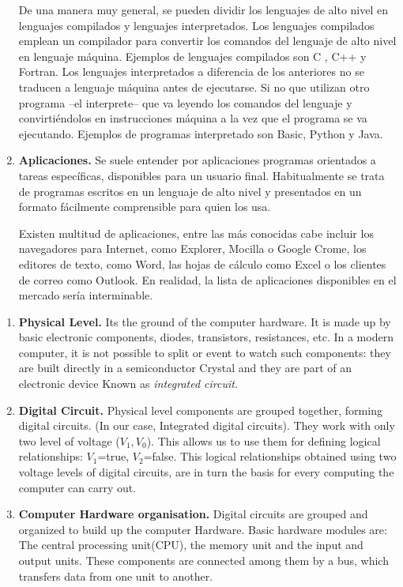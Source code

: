 \begin{paracol}{2}
\begin{enumerate}
De una manera muy general, se pueden dividir los lenguajes de alto nivel en lenguajes compilados y lenguajes interpretados. Los lenguajes compilados emplean un compilador para convertir los comandos del lenguaje de alto nivel en lenguaje máquina. Ejemplos de lenguajes compilados son C , C++ y Fortran. Los lenguajes interpretados a diferencia de los anteriores no se traducen a lenguaje máquina antes de ejecutarse. Si no que utilizan otro programa --el interprete-- que va leyendo los comandos del lenguaje y convirtiéndolos en instrucciones máquina a la vez que el programa se va ejecutando. Ejemplos de programas interpretado son Basic, Python y Java.

\item \textbf{Aplicaciones.}  Se suele entender por aplicaciones programas orientados a tareas específicas, disponibles para un usuario final. Habitualmente se trata de programas escritos en un lenguaje de alto nivel y presentados en un formato fácilmente comprensible para quien los usa.

Existen multitud de aplicaciones, entre las más conocidas cabe incluir los navegadores para Internet, como Explorer, Mocilla o Google Crome, los editores de texto, como Word, las hojas de cálculo como Excel o los clientes de correo como Outlook. En realidad, la lista de aplicaciones disponibles en el mercado sería interminable. 
\end{enumerate}

\switchcolumn
\begin{enumerate}
\item \textbf{Physical Level.} Its the ground of the computer hardware. It is made up by basic electronic components, diodes, transistors, resistances, etc.  In a modern computer, it is not possible to split or event to watch such components: they are built directly in a semiconductor Crystal and they are part of an electronic device Known as \emph{integrated circuit}.

\item \textbf{Digital Circuit.}
Physical level components are grouped together, forming digital circuits. (In our case, Integrated digital circuits). They work with only two level of voltage ($V_1, V_0$). This allows us to use them for defining logical relationships: $V_1$=true, $V_2$=false. This logical relationships obtained using two voltage levels   of  digital circuits,  are in turn the basis for every computing the computer can carry out.

\item \textbf{Computer Hardware organisation.} 
Digital circuits are grouped and organized  to build up the computer Hardware.  Basic hardware modules are: The central processing  unit(CPU), the memory unit and the input and output units. These components are connected among them by a bus, which transfers data from one unit to another.


\end{enumerate}
\end{paracol}
